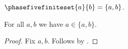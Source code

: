 \begin{definition}\label{phase5_finite_set_definition}
    $\phasefivefiniteset{a}{b} = \{ a, b \}$.
\end{definition}

\begin{proposition}\label{phase5_finite_set_theorem}
    For all $a, b$ we have $a \in \{ a, b \}$.
\end{proposition}
\begin{proof}
    Fix $a, b$.
    Follows by \auto.
\end{proof}
